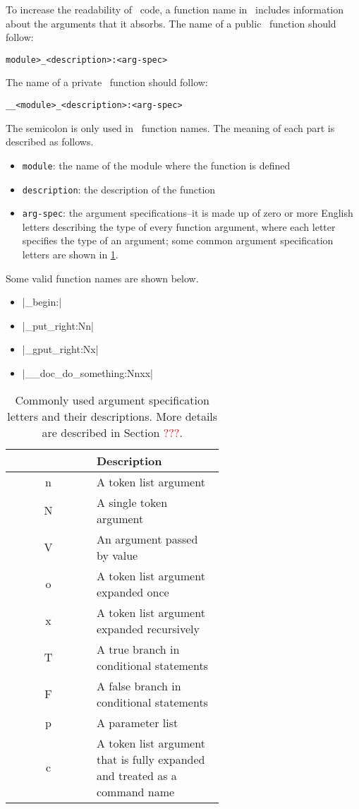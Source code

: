 \documentclass{ltugboat}
\begin{document}
To increase the readability of \liii\ code, a function name in \liii\ includes information about the arguments that it absorbs. The name of a public \liii\ function should follow:
\begin{center}
\texttt{\string\<module>\_<description>:<arg-spec>}
\end{center}
The name of a private \liii\ function should follow:
\begin{center}
\texttt{\string\_\_<module>\_<description>:<arg-spec>}
\end{center}
The semicolon is only used in \liii\ function names.
The meaning of each part is described as follows.
\begin{itemize}
\item \texttt{module}: the name of the module where the function is defined
\item \texttt{description}: the description of the function
\item \texttt{arg-spec}: the argument specifications--it is made up of zero or more English letters describing the type of every function argument, where each letter specifies the type of an argument; some common argument specification letters are shown in \cref{tbl:arg-spec-type}.
\end{itemize}
Some valid function names are shown below.
\begin{itemize}
\item \inltex|\group_begin:|
\item \inltex|\tl_put_right:Nn|
\item \inltex|\tl_gput_right:Nx|
\item \inltex|\__doc_do_something:Nnxx|
\end{itemize}

\begin{table}[htpb]
\centering
\scriptsize
\begin{tabular}{>{\ttfamily\centering}cm{0.6\linewidth}}
\toprule
\multicolumn{1}{c}{\texttt{arg-spec} Letter} & Description\\ \midrule
n & A token list argument\\
N & A single token argument\\
V & An argument passed by value\\
o & A token list argument expanded once\\
x & A token list argument expanded recursively\\
T & A true branch in conditional statements\\
F & A false branch in conditional statements\\
p & A parameter list\\
c & A token list argument that is fully expanded and treated as a command name\\ \bottomrule
\end{tabular}
\caption{Commonly used argument specification letters and their descriptions. More details are described in Section \textcolor{red}{???}.}
\label{tbl:arg-spec-type}
\end{table}
\end{document}

